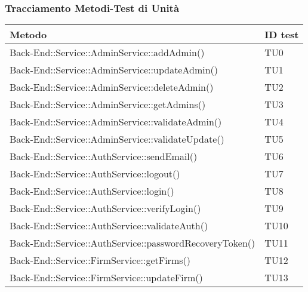 \documentclass[../PianoDiQualifica_v3.0.0.tex]{subfiles}
\begin{document}
	\newpage
	\subsubsection{Tracciamento Metodi-Test di Unità}
	\begin{longtable}[c] {>{\centering\arraybackslash}p{} >{\centering\arraybackslash}p{}}
		\toprule
		\centerline{\textbf{Metodo}} & \centerline{\textbf{ID test}}  \\
			\midrule
	 		Back-End::Service::AdminService::addAdmin() & TU0 \\
	 		\addlinespace[0.3em]
			\midrule
			\addlinespace[0.3em]
			Back-End::Service::AdminService::updateAdmin() & TU1 \\
			\addlinespace[0.3em]
			\midrule
			\addlinespace[0.3em]
 			Back-End::Service::AdminService::deleteAdmin() & TU2 \\
 			\addlinespace[0.3em]
			\midrule
			\addlinespace[0.3em]
 			Back-End::Service::AdminService::getAdmins() & TU3 \\
 			\addlinespace[0.3em]
			\midrule
			\addlinespace[0.3em]
			Back-End::Service::AdminService::validateAdmin() & TU4 \\
 			\addlinespace[0.3em]
			\midrule
			\addlinespace[0.3em]
 			Back-End::Service::AdminService::validateUpdate() & TU5 \\
 			\addlinespace[0.3em]
			\midrule
			\addlinespace[0.3em]
 			Back-End::Service::AuthService::sendEmail() & TU6 \\
 			\addlinespace[0.3em]
			\midrule
			\addlinespace[0.3em]
 			Back-End::Service::AuthService::logout() & TU7 \\
 			\addlinespace[0.3em]
			\midrule
			\addlinespace[0.3em]
 			Back-End::Service::AuthService::login() & TU8 \\
 			\addlinespace[0.3em]
			\midrule
			\addlinespace[0.3em]
			Back-End::Service::AuthService::verifyLogin() & TU9 \\
 			\addlinespace[0.3em]
			\midrule
			\addlinespace[0.3em]
			Back-End::Service::AuthService::validateAuth() & TU10 \\
 			\addlinespace[0.3em]
			\midrule
			\addlinespace[0.3em]
			Back-End::Service::AuthService::passwordRecoveryToken() & TU11 \\
 			\addlinespace[0.3em]
			\midrule
			\addlinespace[0.3em]
			Back-End::Service::FirmService::getFirms() & TU12 \\
 			\addlinespace[0.3em]
			\midrule
			\addlinespace[0.3em]
			Back-End::Service::FirmService::updateFirm() & TU13 \\

\end{longtable}
\end{document}
